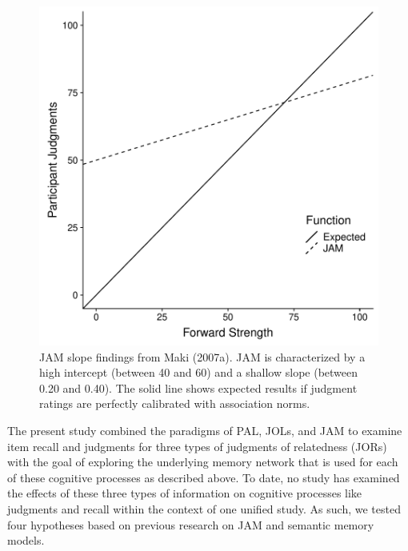 \documentclass[english,,man]{apa6}
\begin{document}
\begin{figure}[htbp]
\centering
\includegraphics{max_buch_JOL_files/figure-latex/makislope-1.pdf}
\caption{\label{fig:makislope}JAM slope findings from Maki (2007a). JAM is
characterized by a high intercept (between 40 and 60) and a shallow
slope (between 0.20 and 0.40). The solid line shows expected results if
judgment ratings are perfectly calibrated with association norms.}
\end{figure}

The present study combined the paradigms of PAL, JOLs, and JAM to
examine item recall and judgments for three types of judgments of
relatedness (JORs) with the goal of exploring the underlying memory
network that is used for each of these cognitive processes as described
above. To date, no study has examined the effects of these three types
of information on cognitive processes like judgments and recall within
the context of one unified study. As such, we tested four hypotheses
based on previous research on JAM and semantic memory models.
\end{document}
